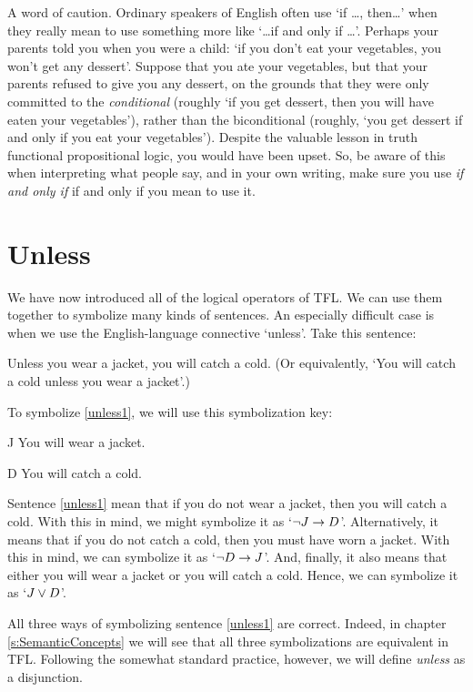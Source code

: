A word of caution. Ordinary speakers of English often use `if \ldots, then\ldots' when they really mean to use something more like `\ldots if and only if \ldots'. Perhaps your parents told you when you were a child: `if you don't eat your vegetables, you won't get any dessert'. Suppose that you ate your vegetables, but that your parents refused to give you any dessert, on the grounds that they were only committed to the \emph{conditional} (roughly `if you get dessert, then you will have eaten your vegetables'), rather than the biconditional (roughly, `you get dessert if and only if you eat your vegetables'). Despite the valuable lesson in truth functional propositional logic, you would have been upset. So, be aware of this when interpreting what people say, and in your own writing, make sure you use \textit{if and only if} if and only if you mean to use it.

\section{Unless}\label{s:unless}
We have now introduced all of the logical operators of TFL. We can use them together to symbolize many kinds of sentences. An especially difficult case is when we use the English-language connective `unless'. Take this sentence:

\begin{earg}
\item[\ex{unless1}] Unless you wear a jacket, you will catch a cold. (Or equivalently, `You will catch a cold unless you wear a jacket'.) 
\end{earg}
To symbolize \ref{unless1}, we will use this symbolization key:
	\begin{ekey}
		\item[J] You will wear a jacket.
		\item[D] You will catch a cold.
	\end{ekey}
Sentence \ref{unless1} mean that if you do not wear a jacket, then you will catch a cold. With this in mind, we might symbolize it as `${\neg} J \rightarrow D$'. Alternatively, it means that if you do not catch a cold, then you must have worn a jacket. With this in mind, we can symbolize it as `${\neg} D \rightarrow J$'. And, finally, it also means that either you will wear a jacket or you will catch a cold. Hence, we can symbolize it as `$J \vee D$'.

All three ways of symbolizing sentence \ref{unless1} are correct. Indeed, in chapter \ref{s:SemanticConcepts} we will see that all three symbolizations are equivalent in TFL. Following the somewhat standard practice, however, we will define \textit{unless} as a disjunction.
	
